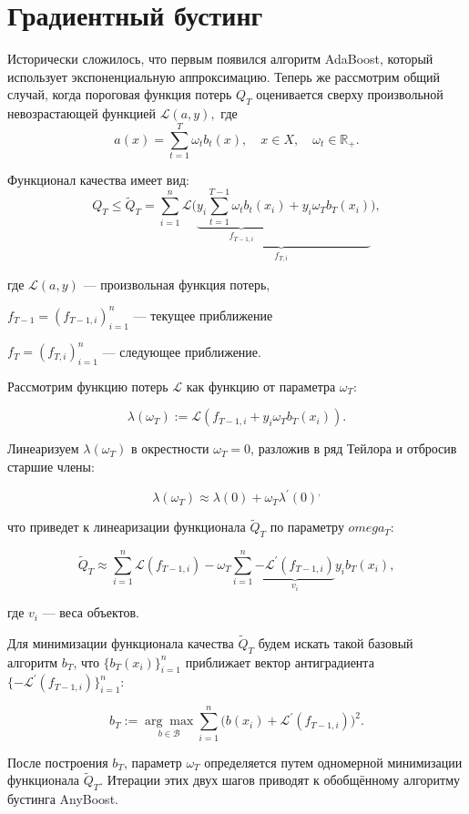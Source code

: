 \documentclass[specialist, 12pt, href]{article}
\begin{document}
\section{Градиентный бустинг}

Исторически сложилось, что первым появился алгоритм AdaBoost, который использует экспоненциальную аппроксимацию. 
Теперь же рассмотрим общий случай, когда пороговая функция потерь $Q_T$ оценивается сверху произвольной невозрастающей функцией $\mathcal{L}(a,y),$ где 
$$a(x) = \sum\limits_{t=1}^T \omega_t b_t(x), \quad x \in X, \quad \omega_t \in \mathbb{R}_+.$$

Функционал качества имеет вид:
$$Q_T \leq \tilde Q_T= \sum \limits_{i = 1}^n \mathcal{L} \underbrace{\bigg ( \underset{f_{T-1,i}}{\underbrace{y_i\sum\limits_{t=1}^{T-1} \omega_t b_t(x_i)}} + y_i\omega_T b_T(x_i) }_{f_{T, i}}\bigg),$$

где $ \mathcal{L}(a,y)$ --- произвольная функция потерь,
 
$f_{T-1} = (f_{T-1,i})_{i=1}^n $ --- текущее приближение 

$f_T = (f_{T,i})_{i=1}^n $ --- следующее приближение.

Рассмотрим функцию потерь $\mathcal{L}$ как функцию от параметра $\omega_T$:

$$\lambda(\omega_T) := \mathcal{L}(f_{T-1,i} + y_i\omega_T b_T(x_i)).$$

Линеаризуем $\lambda(\omega_T)$ в окрестности $\omega_T = 0$, разложив в ряд Тейлора и отбросив старшие члены:

$$\lambda(\omega_T) \approx \lambda(0) + \omega_T \lambda^ \prime (0)^,$$ 

что приведет к линеаризации функционала $\tilde Q_T$ по параметру $omega_T$:

$$\tilde Q_T \approx \sum \limits_{i = 1}^n \mathcal{L}(f_{T-1,i}) - \omega_T \sum \limits_{i = 1}^n\underset{v_i}{\underbrace{ -\mathcal{L} ^ \prime (f_{T-1,i})}} y_ib_T(x_i),$$

где $v_i$ --- веса объектов.

Для минимизации функционала качества $\tilde Q_T$ будем искать такой базовый алгоритм $b_T$, что $\{b_T(x_i)\}_{i = 1}^n$ приближает вектор антиградиента $\{-\mathcal{L} ^ \prime (f_{T-1,i})\}_{i = 1}^n:$

$$b_T := \underset{b  \in \mathcal{B}}{\arg\max} \sum\limits_{i=1}^n \bigg(b(x_i) + \mathcal{L} ^ \prime (f_{T-1,i})\bigg)^2.$$
 
После построения $b_T$, параметр $\omega_T$ определяется путем одномерной минимизации функционала $\tilde Q_T$.
Итерации этих двух шагов приводят к обобщённому
алгоритму бустинга AnyBoost.
\end{document}
